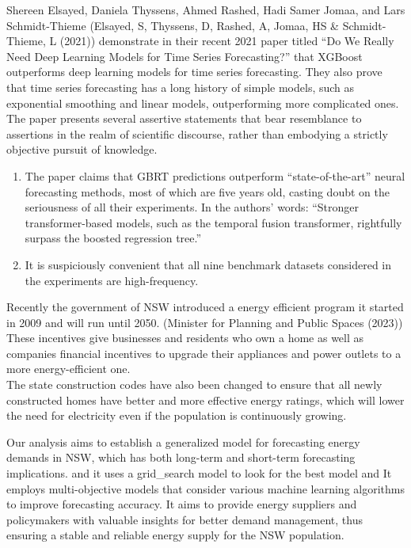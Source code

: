 \documentclass[mstat,12pt]{unswthesis}
\begin{document}
Shereen Elsayed, Daniela Thyssens, Ahmed Rashed, Hadi Samer Jomaa, and
Lars Schmidt-Thieme (Elsayed, S, Thyssens, D, Rashed, A, Jomaa, HS \&
Schmidt-Thieme, L (2021)) demonstrate in their recent 2021 paper titled
``Do We Really Need Deep Learning Models for Time Series Forecasting?''
that XGBoost outperforms deep learning models for time series
forecasting. They also prove that time series forecasting has a long
history of simple models, such as exponential smoothing and linear
models, outperforming more complicated ones. The paper presents several
assertive statements that bear resemblance to assertions in the realm of
scientific discourse, rather than embodying a strictly objective pursuit
of knowledge.

\begin{enumerate}
\def\labelenumi{\arabic{enumi}.}
\item
  The paper claims that GBRT predictions outperform ``state-of-the-art''
  neural forecasting methods, most of which are five years old, casting
  doubt on the seriousness of all their experiments. In the authors'
  words: ``Stronger transformer-based models, such as the temporal
  fusion transformer, rightfully surpass the boosted regression tree.''
\item
  It is suspiciously convenient that all nine benchmark datasets
  considered in the experiments are high-frequency.
\end{enumerate}

Recently the government of NSW introduced a energy efficient program it
started in 2009 and will run until 2050. (Minister for Planning and
Public Spaces (2023)) These incentives give businesses and residents who
own a home as well as companies financial incentives to upgrade their
appliances and power outlets to a more energy-efficient one.\\
The state construction codes have also been changed to ensure that all
newly constructed homes have better and more effective energy ratings,
which will lower the need for electricity even if the population is
continuously growing.

Our analysis aims to establish a generalized model for forecasting
energy demands in NSW, which has both long-term and short-term
forecasting implications. and it uses a grid\_search model to look for
the best model and It employs multi-objective models that consider
various machine learning algorithms to improve forecasting accuracy. It
aims to provide energy suppliers and policymakers with valuable insights
for better demand management, thus ensuring a stable and reliable energy
supply for the NSW population.
\end{document}
